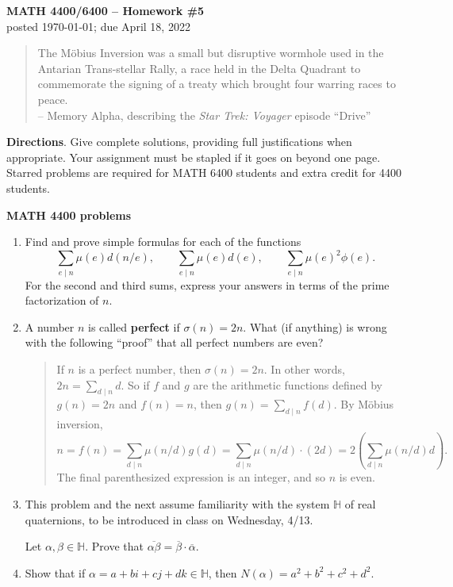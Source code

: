 \documentclass[11pt]{article}
\def\H{\mathbb{H}}
\begin{document}
\thispagestyle{empty} \begin{center} {\textbf{MATH 4400/6400 --
Homework \#5}\\ posted \today; due April 18, 2022}
\end{center}

\begin{quote} {\scriptsize The M\"{o}bius Inversion was a small but disruptive wormhole used in the Antarian Trans-stellar Rally, a race held in the Delta Quadrant to commemorate the signing of a treaty which brought four warring races to peace. \\
-- Memory Alpha, describing the \textsl{Star Trek: Voyager} episode ``Drive''}
\end{quote}


\noindent\textbf{Directions}. Give complete solutions, providing full justifications when appropriate. Your assignment must be stapled if it goes on beyond one page.  Starred problems are required for MATH 6400 students and extra credit for 4400 students.
\vskip 0.1in

\noindent \textbf{MATH 4400 problems}

\begin{enumerate}

\item Find and prove simple formulas for each of the functions
\[ \sum_{e \mid n} \mu(e) d(n/e), \qquad \sum_{e \mid n} \mu(e)d(e), \qquad \sum_{e \mid n} \mu(e)^2\phi(e). \]
For the second and third sums, express your answers in terms of the prime factorization of $n$.


\item A number $n$ is called \textbf{perfect} if $\sigma(n)=2n$.  What (if anything) is wrong with the following ``proof'' that all perfect numbers are even?
    \begin{quote}{\small If $n$ is a perfect number, then $\sigma(n) = 2n$. In other words, $2n = \sum_{d \mid n} d$. So if $f$ and $g$ are the arithmetic functions defined by $g(n) = 2n$ and $f(n) =n$, then $g(n) = \sum_{d \mid n} f(d)$. By M\"{o}bius inversion,
    \[ n = f(n) = \sum_{d \mid n} \mu(n/d) g(d)= \sum_{d \mid n} \mu(n/d)\cdot (2d) = 2\left(\sum_{d \mid n}\mu(n/d) d\right). \]
    The final parenthesized expression is an integer, and so $n$ is even.}
    \end{quote}



\item This problem and the next assume familiarity with the system $\H$ of real quaternions, to be introduced in class on Wednesday, 4/13.

Let $\alpha,\beta \in \H$. Prove that $\overline{\alpha\beta} =\overline{\beta}\cdot \overline{\alpha}$.

\item Show that if $\alpha = a+bi+cj + dk \in \H$, then $N(\alpha)=a^2+b^2+c^2+d^2$.
\end{enumerate}
\end{document}
